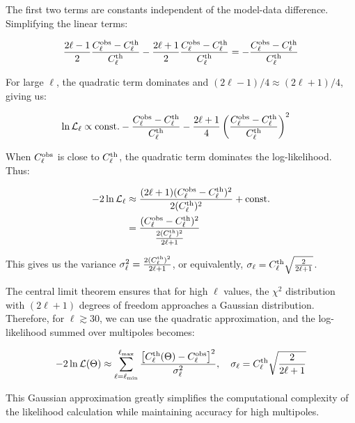 \documentclass[11pt]{article}
\theoremstyle{definition}
\begin{document}
The first two terms are constants independent of the model-data difference. Simplifying the linear terms:

\begin{align}
\frac{2\ell-1}{2}\frac{C_\ell^{\rm obs} - C_\ell^{\rm th}}{C_\ell^{\rm th}} - \frac{2\ell+1}{2}\frac{C_\ell^{\rm obs} - C_\ell^{\rm th}}{C_\ell^{\rm th}} = -\frac{C_\ell^{\rm obs} - C_\ell^{\rm th}}{C_\ell^{\rm th}}
\end{align}

For large $\ell$, the quadratic term dominates and $(2\ell-1)/4 \approx (2\ell+1)/4$, giving us:

\begin{align}
\ln\mathcal{L}_\ell &\propto \text{const.} -\frac{C_\ell^{\rm obs} - C_\ell^{\rm th}}{C_\ell^{\rm th}} - \frac{2\ell+1}{4}\left(\frac{C_\ell^{\rm obs} - C_\ell^{\rm th}}{C_\ell^{\rm th}}\right)^2
\end{align}

When $C_\ell^{\rm obs}$ is close to $C_\ell^{\rm th}$, the quadratic term dominates the log-likelihood. Thus:

\begin{align}
-2\ln\mathcal{L}_\ell &\approx \frac{(2\ell+1)(C_\ell^{\rm obs} - C_\ell^{\rm th})^2}{2(C_\ell^{\rm th})^2} + \text{const.} \\
&= \frac{(C_\ell^{\rm obs} - C_\ell^{\rm th})^2}{\frac{2(C_\ell^{\rm th})^2}{2\ell+1}} 
\end{align}

This gives us the variance $\sigma_\ell^2 = \frac{2(C_\ell^{\rm th})^2}{2\ell+1}$, or equivalently, $\sigma_\ell = C_\ell^{\rm th}\sqrt{\frac{2}{2\ell+1}}$.

The central limit theorem ensures that for high $\ell$ values, the $\chi^2$ distribution with $(2\ell+1)$ degrees of freedom approaches a Gaussian distribution. Therefore, for $\ell \gtrsim 30$, we can use the quadratic approximation, and the log-likelihood summed over multipoles becomes:

\begin{equation}
  -2\ln\mathcal{L}(\Theta) \approx \sum_{\ell=\ell_{\min}}^{\ell_{\max}}
    \frac{\bigl[C_\ell^{\rm th}(\Theta)-C_\ell^{\rm obs}\bigr]^2}
         {\sigma_\ell^2},
  \quad
  \sigma_\ell = C_\ell^{\rm th}\sqrt{\frac{2}{2\ell+1}}
\end{equation}

This Gaussian approximation greatly simplifies the computational complexity of the likelihood calculation while maintaining accuracy for high multipoles.
\end{document}
